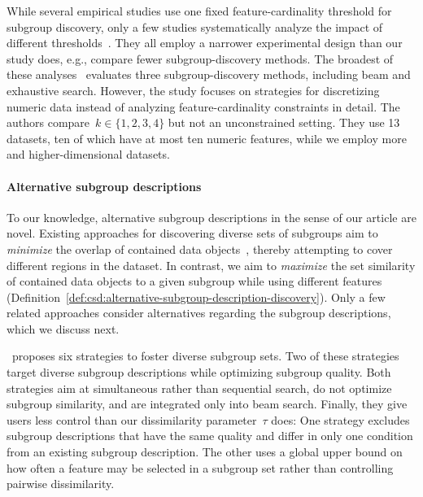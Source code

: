 \documentclass[acmsmall]{acmart} %
\theoremstyle{acmplain}
\theoremstyle{acmdefinition}
\begin{document}
While several empirical studies use one fixed feature-cardinality threshold for subgroup discovery, only a few studies systematically analyze the impact of different thresholds~\cite{friedman1999bump, lemmerich2010fast, meeng2021real, proencca2022robust}.
They all employ a narrower experimental design than our study does, e.g., compare fewer subgroup-discovery methods.
The broadest of these analyses~\cite{meeng2021real} evaluates three subgroup-discovery methods, including beam and exhaustive search.
However, the study focuses on strategies for discretizing numeric data instead of analyzing feature-cardinality constraints in detail.
The authors compare~$k \in \{1, 2, 3, 4\}$ but not an unconstrained setting.
They use 13 datasets, ten of which have at most ten numeric features, while we employ more and higher-dimensional datasets.

\paragraph{Alternative subgroup descriptions}

To our knowledge, alternative subgroup descriptions in the sense of our article are novel.
Existing approaches for discovering diverse sets of subgroups aim to \emph{minimize} the overlap of contained data objects~\cite{atzmueller2015subgroup, belfodil2019fssd, bosc2018anytime, leeuwen2012diverse, lucas2018ssdp+}, thereby attempting to cover different regions in the dataset.
In contrast, we aim to \emph{maximize} the set similarity of contained data objects to a given subgroup while using different features (Definition~\ref{def:csd:alternative-subgroup-description-discovery}).
Only a few related approaches consider alternatives regarding the subgroup descriptions, which we discuss next.

\cite{leeuwen2012diverse}~proposes six strategies to foster diverse subgroup sets.
Two of these strategies target diverse subgroup descriptions while optimizing subgroup quality.
Both strategies aim at simultaneous rather than sequential search, do not optimize subgroup similarity, and are integrated only into beam search.
Finally, they give users less control than our dissimilarity parameter~$\tau$ does:
One strategy excludes subgroup descriptions that have the same quality and differ in only one condition from an existing subgroup description.
The other uses a global upper bound on how often a feature may be selected in a subgroup set rather than controlling pairwise dissimilarity.
\end{document}
